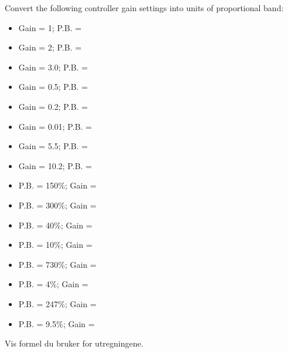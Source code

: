 

Convert the following controller gain settings into units of proportional band:
\begin{multicols}{2}
\begin{itemize}
\item{}Gain = 1; P.B. = \underbar{\hskip 50pt}
\vskip 5pt
\item{}Gain = 2; P.B. = \underbar{\hskip 50pt} 
\vskip 5pt
\item{}Gain = 3.0; P.B. = \underbar{\hskip 50pt} 
\vskip 5pt
\item{}Gain = 0.5; P.B. = \underbar{\hskip 50pt}
\vskip 5pt
\item{}Gain = 0.2; P.B. = \underbar{\hskip 50pt} 
\vskip 5pt
\item{}Gain = 0.01; P.B. = \underbar{\hskip 50pt} 
\vskip 5pt
\item{}Gain = 5.5; P.B. = \underbar{\hskip 50pt} 
\vskip 5pt
\item{}Gain = 10.2; P.B. = \underbar{\hskip 50pt} 
\end{itemize} 



\begin{itemize}
\item{}P.B. = 150\%; Gain = \underbar{\hskip 50pt}
\vskip 5pt
\item{}P.B. = 300\%; Gain = \underbar{\hskip 50pt} 
\vskip 5pt
\item{}P.B. = 40\%; Gain = \underbar{\hskip 50pt} 
\vskip 5pt
\item{}P.B. = 10\%; Gain = \underbar{\hskip 50pt} 
\vskip 5pt
\item{}P.B. = 730\%; Gain = \underbar{\hskip 50pt} 
\vskip 5pt
\item{}P.B. = 4\%; Gain = \underbar{\hskip 50pt} 
\vskip 5pt
\item{}P.B. = 247\%; Gain = \underbar{\hskip 50pt} 
\vskip 5pt
\item{}P.B. = 9.5\%; Gain = \underbar{\hskip 50pt} 
\end{itemize} 
\end{multicols}

\vskip 5pt 
Vis formel du bruker for utregningene. 
\vskip 5pt 
\vfil \eject






